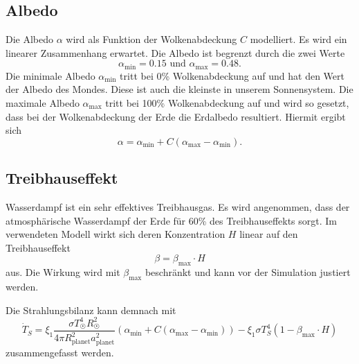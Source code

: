 \begin{refsection}
\subsection{Albedo}
%
Die Albedo $\alpha$ wird als Funktion der Wolkenabdeckung $C$ modelliert. Es wird ein linearer Zusammenhang erwartet. Die Albedo ist begrenzt durch die zwei Werte
\begin{equation}
\alpha_{\text{min}} = 0.15 \text{ und } \alpha_{\text{max}} = 0.48 \text{.}
\end{equation}
Die minimale Albedo $\alpha_{\text{min}}$ tritt bei 0\% Wolkenabdeckung auf und hat den Wert der Albedo des Mondes. Diese ist auch die kleinste in unserem Sonnensystem. Die maximale Albedo $\alpha_{\text{max}}$ tritt bei 100\% Wolkenabdeckung auf und wird so gesetzt, dass bei der Wolkenabdeckung der Erde die Erdalbedo resultiert. Hiermit ergibt sich
\begin{equation}
\alpha = \alpha_{\text{min}} + C(\alpha_{\text{max}} - \alpha_{\text{min}}) \text{.}
\end{equation}

\subsection{Treibhauseffekt}
%
Wasserdampf ist ein sehr effektives Treibhausgas. Es wird angenommen, dass der atmosphärische Wasserdampf der Erde für 60\% des Treibhauseffekts sorgt. \cite{planeten:treibhauseffekt}  
Im verwendeten Modell wirkt sich deren Konzentration $H$ linear auf den Treibhauseffekt 
\begin{equation}
\beta  = \beta_{\text{max}} \cdot H
\end{equation}
aus. Die Wirkung wird mit $\beta_{\text{max}}$ beschränkt und kann vor der Simulation justiert werden.

Die Strahlungsbilanz kann demnach mit
\begin{equation}
\dot{T}_S = \xi_1 \frac{\sigma T_{\astrosun}^4 R_{\astrosun}^2}{4 \pi R_{\text{planet}}^2 a_{\text{planet}}^2} (\alpha_{\text{min}} + C(\alpha_{\text{max}} - \alpha_{\text{min}})) - \xi_1 \sigma T_{S}^4  (1 - \beta_{\text{max}} \cdot H)
\end{equation}
zusammengefasst werden.


\end{refsection}
